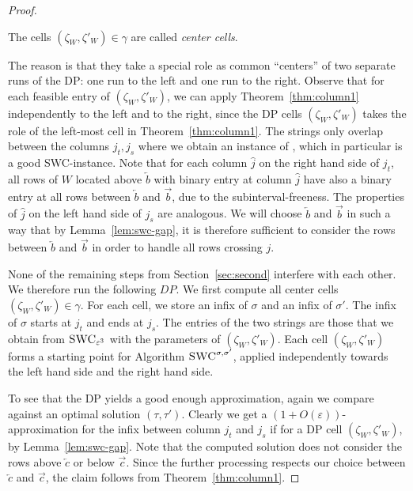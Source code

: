 \begin{proof}
    \begin{definition}
        The cells $(\zeta_W,\zeta'_W) \in \gamma$ are called \emph{center cells}.
        \label{def:center-cells}
    \end{definition}
    The reason is that they take a special role as common ``centers'' of two separate runs of the DP: one run to the left and one run to the right.
    Observe that for each feasible entry of $(\zeta_W,\zeta'_W)$, we can apply Theorem~\ref{thm:column1} independently to the left and to the right, since the DP cells $(\zeta_W,\zeta'_W)$ takes the role of the left-most cell in Theorem~\ref{thm:column1}.
    The strings only overlap between the columns $j_t,j_s$ where we obtain an instance of \BMEC, which in particular is a good SWC-instance.
    Note that for each column $\hat{j}$ on the right hand side of $j_t$, all rows of $W$ located above $\overleftarrow{b}$ with binary entry at column $\hat{j}$  have also a binary entry at all rows between $\overleftarrow{b}$ and $\overrightarrow{b}$, due to the subinterval-freeness. 
    The properties of $\hat{j}$ on the left hand side of $j_s$ are analogous.
    We will choose $\overleftarrow{b}$ and $\overrightarrow{b}$ in such a way that by Lemma~\ref{lem:swc-gap}, it is therefore sufficient to consider the rows between $\overleftarrow{b}$ and $\overrightarrow{b}$ in order to handle all rows crossing $j$.

    None of the remaining steps from Section~\ref{sec:second} interfere with each other.
    We therefore run the following $DP$.
    We first compute all center cells $(\zeta_W,\zeta'_W) \in \gamma$.
    For each cell, we store an infix of $\sigma$ and an infix of $\sigma'$.
    The infix of $\sigma$ starts at $j_t$ and ends at $j_s$.
    The entries of the two strings are those that we obtain from $\textsc{SWC}_{\varepsilon^3}$ with the parameters of $(\zeta_W,\zeta'_W)$.
    Each cell $(\zeta_W,\zeta'_W)$ forms a starting point for Algorithm $\textsc{SWC}^{\sigma, \sigma'}$, applied independently towards the left hand side and the right hand side.

    To see that the DP yields a good enough approximation, again we compare against an optimal solution $(\tau,\tau')$.
    Clearly we get a $(1+O(\varepsilon))$-approximation for the infix between column $j_t$ and $j_s$ if for a DP cell $(\zeta_W,\zeta'_W)$, by Lemma~\ref{lem:swc-gap}.
    Note that the computed solution does not consider the rows above $\overleftarrow{c}$ or below $\overrightarrow{c}$.
    Since the further processing respects our choice between $\overleftarrow{c}$ and $\overrightarrow{c}$, the claim follows from Theorem~\ref{thm:column1}. 
\end{proof}

